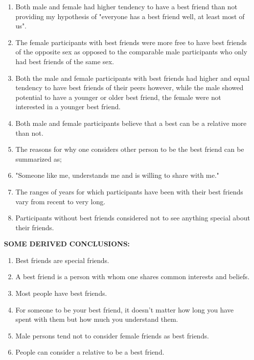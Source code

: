 \documentclass[11pt,a4paper,final]{report}
\begin{document}
\begin{enumerate}
\item \textbf{ }Both male and female had higher tendency to have a best friend than not providing my hypothesis of "everyone has a best friend well, at least most of us".\textbf{}

\item \textbf{ }The female participants with best friends were more free to have best friends of the opposite sex as opposed to the comparable male participants who only had best friends of the same sex.

\item  Both the male and female participants with best friends had higher and equal tendency to have best friends of their peers however, while the male showed potential to have a younger or older best friend, the female were not interested in a younger best friend.

\item  Both male and female participants believe that a best can be a relative more than not.

\item  The reasons for why one considers other person to be the best friend can be summarized as;

\item  "Someone like me, understands me and is willing to share with me."

\item  The ranges of years for which participants have been with their best friends vary from recent to very long.

\item  Participants without best friends considered not to see anything special about their friends.
\end{enumerate}

\noindent 

\noindent \textbf{SOME DERIVED CONCLUSIONS:}

\begin{enumerate}
\item \textbf{ }Best friends are special friends.

\item  A best friend is a person with whom one shares common interests and beliefs.

\item  Most people have best friends.

\item  For someone to be your best friend, it doesn't matter how long you have spent with them but how much you understand them.

\item  Male persons tend not to consider female friends as best friends.

\item  People can consider a relative to be a best friend.
\end{enumerate}

\noindent 

\noindent 

\noindent 

\noindent 
\end{document}
